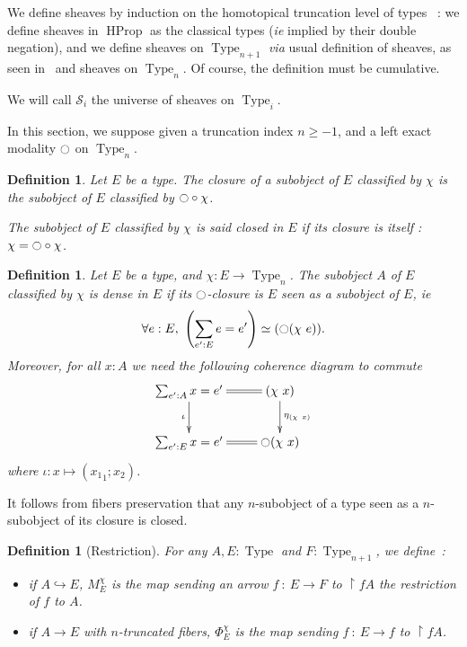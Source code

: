 \documentclass[conference]{IEEEtran}
\newtheorem{defi}[thm]{Definition}
\DeclareMathOperator{\Type}{Type}
\DeclareMathOperator{\HProp}{HProp}
\newcommand{\modal}{\ensuremath{\ocircle}}
\begin{document}
We define sheaves by induction on the homotopical truncation level of types
~: we define sheaves in $\HProp$ as the classical types ({\em ie}
implied by their double negation), and
we define sheaves on $\Type_{n+1}$ {\em via} usual definition of sheaves,
as seen in~\cite{maclanemoerdijk} and sheaves on $\Type_n$. Of course,
the definition must be cumulative.

We will call $\mathcal S_i$ the universe of sheaves on $\Type_i$.


In this section, we suppose given a truncation index $n\geqslant -1$,
and a left exact modality $\modal$ on $\Type_n$.

\begin{defi}
  Let $E$ be a type. The {\em closure} of a subobject of $E$ classified by $\chi$
  is the subobject of $E$ classified by $\modal \circ \chi$.

  The subobject of $E$ classified by $\chi$ is said {\em closed in
    $E$} if its closure is itself : $\chi = \modal \circ \chi$.
\end{defi}

\begin{defi}
  Let $E$ be a type, and $\chi:E \to \Type_n$. The subobject $A$ of $E$
  classified by $\chi$ is {\em dense} in $E$ if its $\modal$-closure
  is $E$ seen as a subobject of $E$, {\em ie}
  $$\forall e:E,~ \left(\sum_{e':E} e=e'\right) \simeq (\modal (\chi~e)).$$ 
  Moreover, for all $x:A$ we need the following coherence diagram to
  commute
  $$\xymatrix{
    \sum_{e':A} x = e' \ar@{=}[r] \ar[d]_\iota & (\chi~x) \ar[d]^{\eta_{(\chi~x)}}\\
    \sum_{e':E} x = e' \ar@{=}[r] & \modal (\chi~x)
  }$$
  where $\iota: x \mapsto ({x_1}_1 ; x_2)$.
\end{defi}

It follows from fibers preservation that any $n$-subobject of a type seen as a $n$-subobject
of its closure is closed.

\begin{defi}[Restriction]
  For any $A, E:\Type$ and $F:\Type_{n+1}$, we define~:
  \begin{itemize}
  \item if $A \hookrightarrow E$, $M_E^\chi$ is the map sending an
    arrow $f~:~E\to F$ to $\restriction f A$ the restriction of $f$ to $A$.
  \item if $A \to E$ with $n$-truncated fibers, $\Phi_E^\chi$ is the
    map sending $f~:~E \to f$ to $\restriction f A$.
  \end{itemize}
\end{defi}
\end{document}
